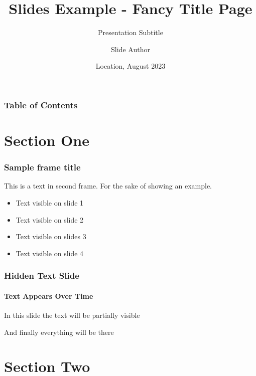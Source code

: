 \documentclass[aspectratio=1610]{beamer}
\title[Slides Example - Fancy Title Page] %
{Slides Example - Fancy Title Page}
\subtitle{Presentation Subtitle}
\author[Author, Slide] %
{Slide Author\inst{1}}
\institute[Institutional Affiliation] %
{
  \inst{1}%
  Institutional Affiliation
}
\date[2023.08] %
{Location, August 2023}
\begin{document}
\frame[b,nittanytitle]{\titlepage}

\begin{frame}
\frametitle{Table of Contents}
\tableofcontents
\end{frame}


\section{Section One}

\begin{frame}
\frametitle{Sample frame title}


This is a text in second frame. For the sake of showing an example.


\begin{itemize}
    \item<1-> Text visible on slide 1
    \item<2-> Text visible on slide 2
    \item<3> Text visible on slides 3
    \item<4-> Text visible on slide 4
\end{itemize}
\end{frame}



\begin{frame}
\frametitle{Hidden Text Slide}
\framesubtitle{Text Appears Over Time}
In this slide \pause
the text will be partially visible \pause

And finally everything will be there
\end{frame}

\section{Section Two}
\end{document}
